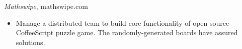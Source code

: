 {\sl Mathswipe}, mathswipe.com
\begin{itemize} \itemsep -2pt %
\item  Manage a distributed team to build core functionality of open-source CoffeeScript puzzle game. The randomly-generated boards have assured solutions.
\end{itemize}
